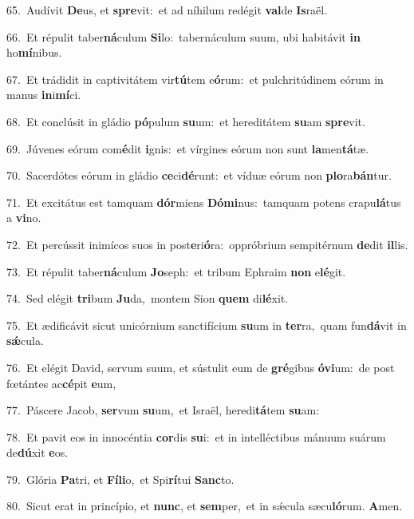 {\numbfont\textcolor{\numbcolor}{65.}}~Audívit \textbf{De}\-us, et \textbf{spre}\-vit:~\star et ad níhilum redégit \textbf{val}\-de \textbf{Is}\-raël.\par
{\numbfont\textcolor{\numbcolor}{66.}}~Et répulit taber\-\textbf{ná}\-culum \textbf{Si}\-lo:~\star tabernáculum suum, ubi habitávit \textbf{in} ho\-\textbf{mí}\-nibus.\par
{\numbfont\textcolor{\numbcolor}{67.}}~Et trádidit in captivitátem vir\-\textbf{tú}\-tem e\-\textbf{ó}\-rum:~\star et pulchritúdinem eórum in manus \textbf{in}\-i\-\textbf{mí}\-ci.\par
{\numbfont\textcolor{\numbcolor}{68.}}~Et conclúsit in gládio \textbf{pó}\-pulum \textbf{su}\-um:~\star et hereditátem \textbf{su}\-am \textbf{spre}\-vit.\par
{\numbfont\textcolor{\numbcolor}{69.}}~Júvenes eórum com\-\textbf{é}\-dit \textbf{i}\-gnis:~\star et vírgines eórum non sunt \textbf{la}\-men\-\textbf{tá}\-tæ.\par
{\numbfont\textcolor{\numbcolor}{70.}}~Sacerdótes eórum in gládio \textbf{ce}\-ci\-\textbf{dé}\-runt:~\star et víduæ eórum non \textbf{plo}\-ra\-\textbf{bán}\-tur.\par
{\numbfont\textcolor{\numbcolor}{71.}}~Et excitátus est tamquam \textbf{dór}\-miens \textbf{Dó}\-\textbf{mi}nus:~\star tamquam potens crapu\-\textbf{lá}\-tus a \textbf{vi}\-no.\par
{\numbfont\textcolor{\numbcolor}{72.}}~Et percússit inimícos suos in post\-\textbf{e}\-ri\-\textbf{ó}\-ra:~\star oppróbrium sempitérnum \textbf{de}\-dit \textbf{il}\-lis.\par
{\numbfont\textcolor{\numbcolor}{73.}}~Et répulit taber\-\textbf{ná}\-culum \textbf{Jo}\-seph:~\star et tribum Ephraim \textbf{non} e\-\textbf{lé}\-git.\par
{\numbfont\textcolor{\numbcolor}{74.}}~Sed elégit \textbf{tri}\-bum \textbf{Ju}\-da,~\star montem Sion \textbf{quem} di\-\textbf{lé}\-xit.\par
{\numbfont\textcolor{\numbcolor}{75.}}~Et ædificávit sicut unicórnium sanctifícium \textbf{su}\-um in \textbf{ter}\-ra,~\star quam fun\-\textbf{dá}\-vit in \textbf{sǽ}\-cula.\par
{\numbfont\textcolor{\numbcolor}{76.}}~Et elégit David, servum suum, et sústulit eum de \textbf{gré}\-gibus \textbf{ó}\-\textbf{vi}um:~\star de post fœtántes ac\-\textbf{cé}\-pit \textbf{e}\-um,\par
{\numbfont\textcolor{\numbcolor}{77.}}~Páscere Jacob, \textbf{ser}\-vum \textbf{su}\-um,~\star et Israël, heredi\-\textbf{tá}\-tem \textbf{su}\-am:\par
{\numbfont\textcolor{\numbcolor}{78.}}~Et pavit eos in innocéntia \textbf{cor}\-dis \textbf{su}\-i:~\star et in intelléctibus mánuum suárum de\-\textbf{dú}\-xit \textbf{e}\-os.\par
{\numbfont\textcolor{\numbcolor}{79.}}~Glória \textbf{Pa}\-tri, et \textbf{Fí}\-\textbf{li}o,~\star et Spi\-\textbf{rí}\-tui \textbf{Sanc}\-to.\par
{\numbfont\textcolor{\numbcolor}{80.}}~Sicut erat in princípio, et \textbf{nunc}\-, et \textbf{sem}\-per,~\star et in sǽcula sæcu\-\textbf{ló}\-rum. \textbf{A}\-men.\par
